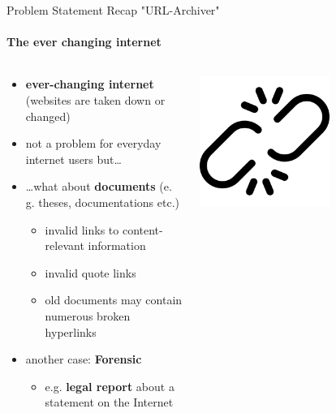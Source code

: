 \documentclass[
    ngerman,%
    authorontitle=true,
]{bfhbeamer}
\begin{document}
    \begin{frame}{Problem Statement Recap "URL-Archiver"}
        \framesubtitle{The ever changing internet}
        \begin{columns} %
            \begin{column}{0.6\textwidth} %
                \begin{itemize}
                    \item \textbf{ever-changing internet} (websites are taken down or changed)
                    \item not a problem for everyday internet users but\ldots
                    \item \ldots what about \textbf{documents} (e. g. theses, documentations etc.)
                    \begin{itemize}
                        \item invalid links to content-relevant information
                        \item invalid quote links
                        \item old documents may contain numerous broken hyperlinks
                    \end{itemize}
                    \item another case: \textbf{Forensic}
                    \begin{itemize}
                        \item e.g. \textbf{legal report} about a statement on the Internet
                    \end{itemize}
                \end{itemize}
            \end{column}
            \begin{column}{0.3\textwidth} %
                \begin{center}
                    \includegraphics[width=0.6\textwidth]{pictures/broken_link}
                \end{center}
            \end{column}
        \end{columns}
    \end{frame}
\end{document}
